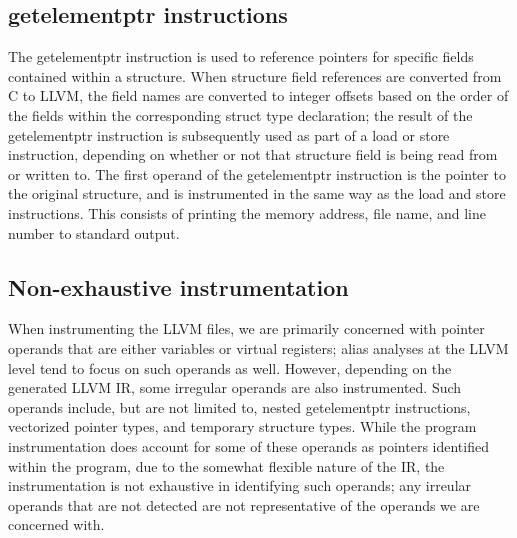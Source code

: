\subsection{getelementptr instructions}
The getelementptr instruction is used to reference pointers for specific fields contained within a structure. When structure field references are converted from C to LLVM, the field names are converted to integer offsets based on the order of the fields within the corresponding struct type declaration; the result of the getelementptr instruction is subsequently used as part of a load or store instruction, depending on whether or not that structure field is being read from or written to. The first operand of the getelementptr instruction is the pointer to the original structure, and is instrumented in the same way as the load and store instructions. This consists of printing the memory address, file name, and line number to standard output.

\subsection{Non-exhaustive instrumentation}
When instrumenting the LLVM files, we are primarily concerned with pointer operands that are either variables or virtual registers; alias analyses at the LLVM level tend to focus on such operands as well. However, depending on the generated LLVM IR, some irregular operands are also instrumented. Such operands include, but are not limited to, nested getelementptr instructions, vectorized pointer types, and temporary structure types. While the program instrumentation does account for some of these operands as pointers identified within the program, due to the somewhat flexible nature of the IR, the instrumentation is not exhaustive in identifying such operands; any irreular operands that are not detected are not representative of the operands we are concerned with.
